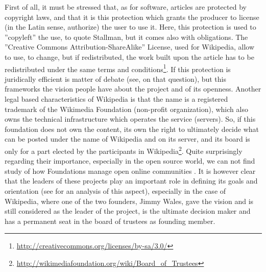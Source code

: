 First of all, it must be stressed that, as for software, articles
are protected by copyright laws, and that it is this protection which
grants the producer to license (in the Latin sense, authorize) the
user to use it. Here, this protection is used to ''copyleft'' the
use, to quote Stallman, but it comes also with obligations. The ''Creative
Commons Attribution-ShareAlike'' License, used for Wikipedia, allow
to use, to change, but if redistributed, the work built upon the article
has to be redistributed under the same terms and conditions\footnote{\url{http://creativecommons.org/licenses/by-sa/3.0/}}.
If this protection is juridically efficient is matter of debate (see\citealp{Wielsch10},
on that question), but this frameworks the vision people have about
the project and of its openness. Another legal based characteristics
of Wikipedia is that the name is a registered trademark of the Wikimedia
Foundation (non-profit organization), which also owns the technical
infrastructure which operates the service (servers). So, if this foundation
does not own the content, its own the right to ultimately decide what
can be posted under the name of Wikipedia and on its server, and its
board is only for a part elected by the participants in Wikipedia\footnote{\url{http://wikimediafoundation.org/wiki/Board_of_Trustees}}.
Quite surprisingly regarding their importance, especially in the open
source world, we can not find study of how Foundations manage open
online communities \citep[chapter 6, mentions this point however and gives a good start for Wikipedia.]{Reagle10}.
It is however clear that the leaders of these projects play an important
role in defining its goals and orientation (see \citealp{CrowstonHeckmanMisiolek10}
for an analysis of this aspect), especially in the case of Wikipedia,
where one of the two founders, Jimmy Wales, gave the vision \citep[chapter 1]{Reagle10}
and is still considered as the leader of the project, is the ultimate
decision maker \citep[chapter 6, which deals with Wikipedia leadership]{Reagle10}
and has a permanent seat in the board of trustees as founding member.

